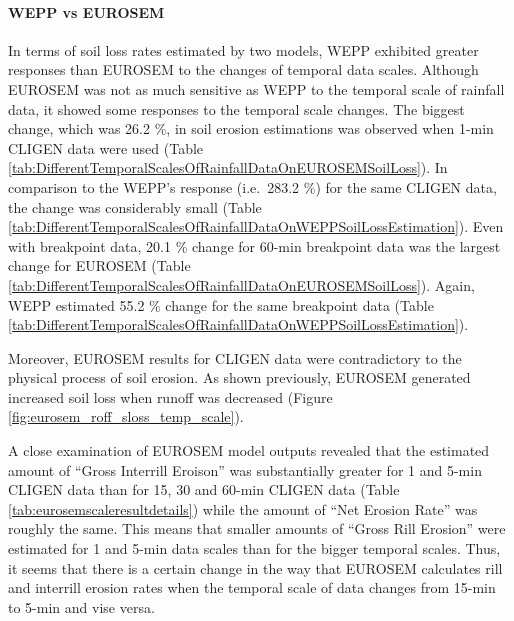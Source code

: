 \paragraph{WEPP vs EUROSEM} In terms of soil loss rates estimated by two
models, WEPP exhibited greater responses than EUROSEM to the changes of temporal
data scales. Although EUROSEM was not as much sensitive as WEPP to the temporal
scale of rainfall data, it showed some responses to the temporal scale changes.
The biggest change, which was 26.2 \%, in soil erosion estimations was observed
when 1-min CLIGEN data were used (Table
\ref{tab:DifferentTemporalScalesOfRainfallDataOnEUROSEMSoilLoss}).
In comparison to the WEPP's response (i.e.\ 283.2 \%) for the same CLIGEN data,
the change was considerably small (Table
\ref{tab:DifferentTemporalScalesOfRainfallDataOnWEPPSoilLossEstimation}). Even
with breakpoint data, 20.1 \% change for 60-min breakpoint data was the largest
change for EUROSEM (Table
\ref{tab:DifferentTemporalScalesOfRainfallDataOnEUROSEMSoilLoss}). Again, WEPP
estimated 55.2 \% change for the same breakpoint data (Table
\ref{tab:DifferentTemporalScalesOfRainfallDataOnWEPPSoilLossEstimation}).

Moreover, EUROSEM results for CLIGEN data were contradictory to the physical
process of soil erosion. As shown previously, EUROSEM generated increased soil
loss when runoff was decreased (Figure \ref{fig:eurosem_roff_sloss_temp_scale}).

A close examination of EUROSEM model outputs revealed that the estimated amount
of ``Gross Interrill Eroison'' was substantially greater for 1 and 5-min CLIGEN
data than for 15, 30 and 60-min CLIGEN data (Table
\ref{tab:eurosemscaleresultdetails}) while the amount of ``Net Erosion Rate''
was roughly the same. This means that smaller amounts of ``Gross Rill Erosion''
were estimated for 1 and 5-min data scales than for the bigger temporal scales.
Thus, it seems that there is a certain change in the way that EUROSEM calculates
rill and interrill erosion rates when the temporal scale of data changes from
15-min to 5-min and vise versa.

